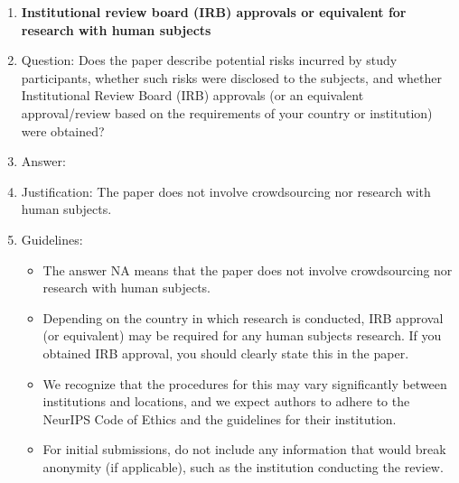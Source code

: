 \documentclass{article}
\theoremstyle{remark}
\begin{document}
\begin{enumerate}
\item {\bf Institutional review board (IRB) approvals or equivalent for research with human subjects}
    \item[] Question: Does the paper describe potential risks incurred by study participants, whether such risks were disclosed to the subjects, and whether Institutional Review Board (IRB) approvals (or an equivalent approval/review based on the requirements of your country or institution) were obtained?
    \item[] Answer: \answerNA{} %
    \item[] Justification: The paper does not involve crowdsourcing nor research with human subjects.
    \item[] Guidelines:
    \begin{itemize}
        \item The answer NA means that the paper does not involve crowdsourcing nor research with human subjects.
        \item Depending on the country in which research is conducted, IRB approval (or equivalent) may be required for any human subjects research. If you obtained IRB approval, you should clearly state this in the paper. 
        \item We recognize that the procedures for this may vary significantly between institutions and locations, and we expect authors to adhere to the NeurIPS Code of Ethics and the guidelines for their institution. 
        \item For initial submissions, do not include any information that would break anonymity (if applicable), such as the institution conducting the review.
    \end{itemize}


\end{enumerate}
\end{document}
